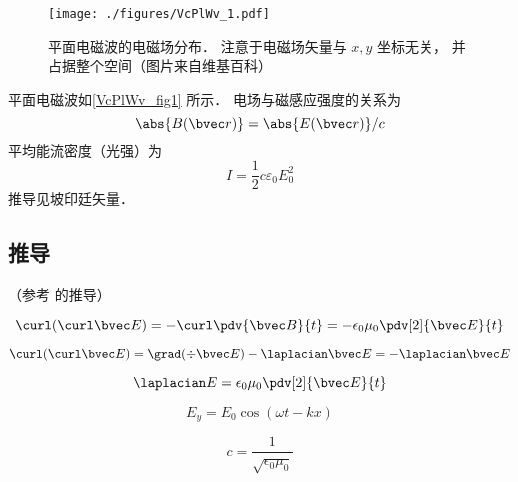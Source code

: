 

\begin{figure}[ht]
\centering
\texttt{[image: ./figures/VcPlWv\_1.pdf]}
\caption{平面电磁波的电磁场分布． 注意于电磁场矢量与 $x, y$ 坐标无关， 并占据整个空间（图片来自维基百科）} \label{VcPlWv_fig1}
\end{figure}

平面电磁波如\autoref{VcPlWv_fig1} 所示． 电场与磁感应强度的关系为
\begin{equation}
\abs{B(\bvec r)} = \abs{E(\bvec r)}/c
\end{equation}
平均能流密度（光强）为
\begin{equation}
I = \frac12 c\varepsilon_0 E_0^2
\end{equation}
推导见坡印廷矢量． %

\subsection{推导}
（参考 \cite{GriffE} 的推导）

\begin{equation}
\curl(\curl \bvec E) = -\curl\pdv{\bvec B}{t} = -\epsilon_0\mu_0 \pdv[2]{\bvec E}{t}
\end{equation}

\begin{equation}
\curl(\curl \bvec E) = \grad(\div \bvec E) - \laplacian \bvec E = - \laplacian \bvec E
\end{equation}

\begin{equation}
\laplacian E = \epsilon_0 \mu_0 \pdv[2]{\bvec E}{t}
\end{equation}

\begin{equation}
E_y = E_0\cos(\omega t - kx)
\end{equation}

\begin{equation}\label{VcPlWv_eq1}
c = \frac{1}{\sqrt{\epsilon_0\mu_0}}
\end{equation}
